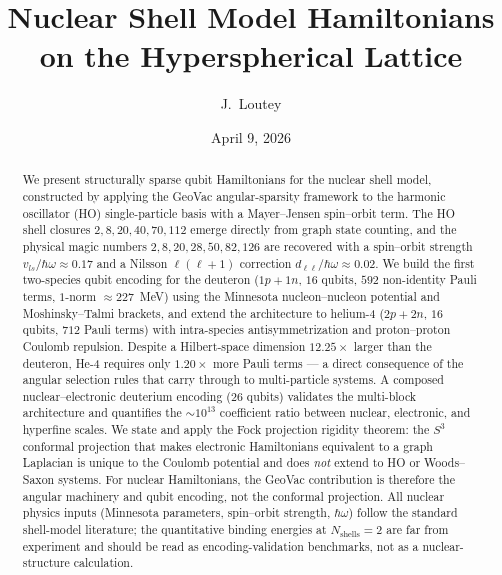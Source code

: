 \documentclass[twocolumn,prc,amsmath,amssymb,superscriptaddress]{revtex4-2}
\begin{document}
\title{Nuclear Shell Model Hamiltonians on the Hyperspherical Lattice}

\author{J.~Loutey}

\date{April 9, 2026}

\begin{abstract}
We present structurally sparse qubit Hamiltonians for the nuclear shell
model, constructed by applying the GeoVac angular-sparsity framework to
the harmonic oscillator (HO) single-particle basis with a Mayer--Jensen
spin--orbit term. The HO shell closures $2, 8, 20, 40, 70, 112$ emerge
directly from graph state counting, and the physical magic numbers
$2, 8, 20, 28, 50, 82, 126$ are recovered with a spin--orbit strength
$v_{ls}/\hbar\omega \approx 0.17$ and a Nilsson $\ell(\ell+1)$ correction
$d_{\ell\ell}/\hbar\omega \approx 0.02$. We build the first two-species
qubit encoding for the deuteron ($1p+1n$, $16$ qubits, $592$ non-identity
Pauli terms, $1$-norm $\approx 227$~MeV) using the Minnesota
nucleon--nucleon potential and Moshinsky--Talmi brackets, and extend the
architecture to helium-4 ($2p+2n$, $16$ qubits, $712$ Pauli terms) with
intra-species antisymmetrization and proton--proton Coulomb repulsion.
Despite a Hilbert-space dimension $12.25\times$ larger than the deuteron,
He-4 requires only $1.20\times$ more Pauli terms --- a direct consequence
of the angular selection rules that carry through to multi-particle
systems. A composed nuclear--electronic deuterium encoding ($26$ qubits)
validates the multi-block architecture and quantifies the
$\sim 10^{13}$ coefficient ratio between nuclear, electronic, and
hyperfine scales. We state and apply the Fock projection rigidity
theorem: the $S^3$ conformal projection that makes electronic Hamiltonians
equivalent to a graph Laplacian is unique to the Coulomb potential and
does \emph{not} extend to HO or Woods--Saxon systems. For nuclear
Hamiltonians, the GeoVac contribution is therefore the angular machinery
and qubit encoding, not the conformal projection. All nuclear physics
inputs (Minnesota parameters, spin--orbit strength, $\hbar\omega$)
follow the standard shell-model literature; the quantitative binding
energies at $N_{\mathrm{shells}}=2$ are far from experiment and should
be read as encoding-validation benchmarks, not as a nuclear-structure
calculation.
\end{abstract}

\maketitle
\end{document}
